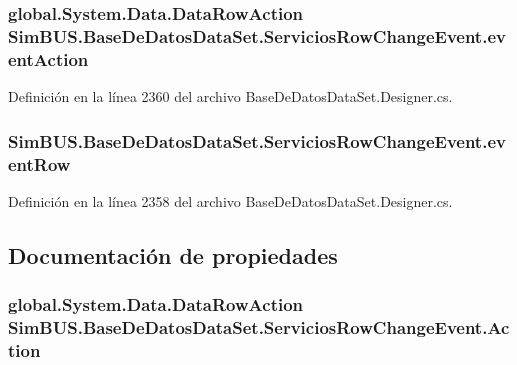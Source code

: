 \subsubsection[{event\-Action}]{\setlength{\rightskip}{0pt plus 5cm}global.\-System.\-Data.\-Data\-Row\-Action Sim\-B\-U\-S.\-Base\-De\-Datos\-Data\-Set.\-Servicios\-Row\-Change\-Event.\-event\-Action\hspace{0.3cm}{\ttfamily [private]}}\label{class_sim_b_u_s_1_1_base_de_datos_data_set_1_1_servicios_row_change_event_acb3e7aa2b8a9f902a1d475baab0a7d3b}


Definición en la línea 2360 del archivo Base\-De\-Datos\-Data\-Set.\-Designer.\-cs.

\subsubsection[{event\-Row}]{ Sim\-B\-U\-S.\-Base\-De\-Datos\-Data\-Set.\-Servicios\-Row\-Change\-Event.\-event\-Row\hspace{0.3cm}{\ttfamily [private]}}\label{class_sim_b_u_s_1_1_base_de_datos_data_set_1_1_servicios_row_change_event_a00e6ca96030e7c3ab39b9b725fd539ff}


Definición en la línea 2358 del archivo Base\-De\-Datos\-Data\-Set.\-Designer.\-cs.



\subsection{Documentación de propiedades}
\subsubsection[{Action}]{\setlength{\rightskip}{0pt plus 5cm}global.\-System.\-Data.\-Data\-Row\-Action Sim\-B\-U\-S.\-Base\-De\-Datos\-Data\-Set.\-Servicios\-Row\-Change\-Event.\-Action\hspace{0.3cm}{\ttfamily [get]}}\label{class_sim_b_u_s_1_1_base_de_datos_data_set_1_1_servicios_row_change_event_a8766fc8bb692061a21d0c6933073314d}


